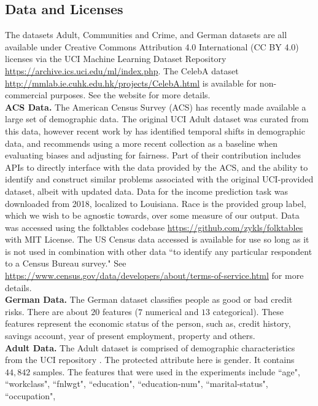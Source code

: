 \subsection{Data and Licenses}

The datasets Adult, Communities and Crime, and German datasets are all available under Creative Commons Attribution 4.0 International (CC BY 4.0) licenses via the UCI Machine Learning Dataset Repository \url{https://archive.ics.uci.edu/ml/index.php}.
The CelebA dataset \url{http://mmlab.ie.cuhk.edu.hk/projects/CelebA.html} is available for non-commercial purposes. See the website for more details.\\
{\bf ACS Data.}
The American Census Survey (ACS) has recently made available a large set of demographic data. The original UCI Adult dataset \cite{uci} was curated from this data, however recent work by \cite{ding2021retiring} has identified temporal shifts in demographic data, and recommends using a more recent collection as a baseline when evaluating biases and adjusting for fairness.
Part of their contribution includes APIs to directly interface with the data provided by the ACS, and the ability to identify and construct similar problems associated with the original UCI-provided dataset, albeit with updated data. Data for the income prediction task was downloaded from 2018, localized to Louisiana. 
Race is the provided group label, which we wish to be agnostic towards, over some measure of our output.
Data was accessed using the folktables codebase \url{https://github.com/zykls/folktables} with MIT License. The US Census data accessed is available for use so long as it is not used in combination with other data ``to identify any particular respondent to a Census Bureau survey." See \url{https://www.census.gov/data/developers/about/terms-of-service.html} for more details.\\
{\bf German Data.}
 The German dataset classifies people as good or bad credit risks. There are about $20$ features ($7$ numerical and $13$ categorical). These features represent the economic status of the person, such as, credit history, savings account, year of present employment, property and others. \\
{\bf Adult Data.}
The Adult dataset is comprised of demographic characteristics  from the UCI repository \cite{uci}. The protected attribute here is gender. It contains $44,842$ samples. The features that were used in the experiments include ``age", ``workclass", ``fnlwgt", ``education",                           ``education-num", ``marital-status", ``occupation",
